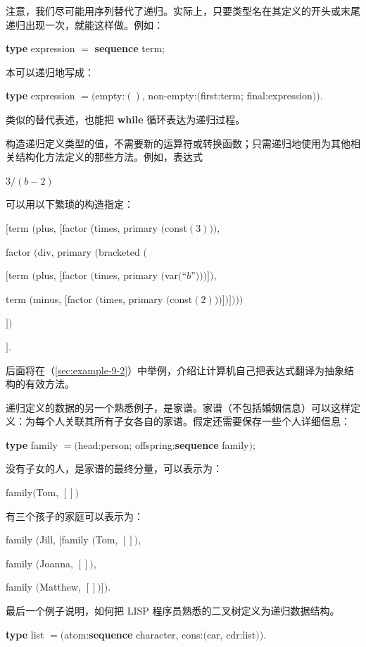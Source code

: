 \documentclass[twoside,11pt,fontset=none]{ctexbook}
\begin{document}
注意，我们尽可能用序列替代了递归。实际上，只要类型名在其定义的开头或末尾递归出现一次，就能这样做。例如：

\quad \textbf{type} expression $=$ \textbf{sequence} term;

\noindent
本可以递归地写成：

\quad \textbf{type} expression $= ($empty:$()$, non-empty:$($first:term; final:expression$))$.

\noindent
类似的替代表述，也能把 \textbf{while} 循环表达为递归过程。

构造递归定义类型的值，不需要新的运算符或转换函数；只需递归地使用为其他相关结构化方法定义的那些方法。例如，表达式

\quad $3/(b - 2)$

\noindent
可以用以下繁琐的构造指定：

\quad $[$term $($plus, $[$factor (times, primary $($const$(3)))$,

\tabto*{7.75em} factor $($div, primary $($bracketed $($

\tabto*{9em}  $[$term $($plus, $[$factor $($times, primary $($var$($``$b$''$)))]),$

\tabto*{9.1em}  term $($minus, $[$factor $($times, primary $($const$(2)))])])))$

\tabto*{7.55em}  $])$

\quad $]$.

\noindent
后面将在（\ref{sec:example-9-2}）中举例，介绍让计算机自己把表达式翻译为抽象结构的有效方法。

递归定义的数据的另一个熟悉例子，是家谱。家谱（不包括婚姻信息）可以这样定义：为每个人关联其所有子女各自的家谱。假定还需要保存一些个人详细信息：

\quad \textbf{type} family $= ($head:person; offspring:\textbf{sequence} family$)$;

没有子女的人，是家谱的最终分量，可以表示为：

\quad family$($Tom, $[])$

\noindent
有三个孩子的家庭可以表示为：

\noindent
family $($Jill, $[$family $($Tom, $[])$,

\tabto{3.2em} family $($Joanna, $[])$,

\tabto{3.2em} family $($Matthew, $[])])$.

最后一个例子说明，如何把 LISP 程序员熟悉的二叉树定义为递归数据结构。

\quad \textbf{type} list $= ($atom:\textbf{sequence} character, cons:$($car, cdr:list$))$.
\end{document}
